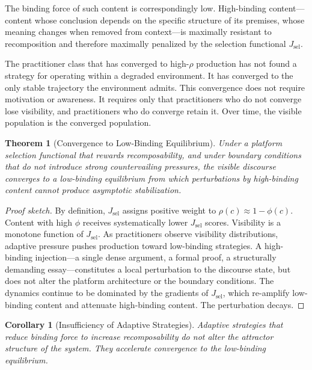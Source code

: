 \documentclass[12pt]{article}
\newtheorem{theorem}{Theorem}[section]
\newtheorem{corollary}{Corollary}[theorem]
\newcommand{\bind}{\phi}
\newcommand{\recomp}{\rho}
\newcommand{\Jsel}{J_{\mathrm{sel}}}
\begin{document}
The binding force of such content is correspondingly low. High-binding
content—content whose conclusion depends on the specific structure of its
premises, whose meaning changes when removed from context—is maximally
resistant to recomposition and therefore maximally penalized by the
selection functional $\Jsel$.

The practitioner class that has converged to high-$\recomp$ production has
not found a strategy for operating within a degraded environment. It has
converged to the only stable trajectory the environment admits. This
convergence does not require motivation or awareness. It requires only that
practitioners who do not converge lose visibility, and practitioners who do
converge retain it. Over time, the visible population is the converged
population.

\begin{theorem}[Convergence to Low-Binding Equilibrium]
\label{thm:convergence}
Under a platform selection functional that rewards recomposability, and
under boundary conditions that do not introduce strong countervailing
pressures, the visible discourse converges to a low-binding equilibrium
from which perturbations by high-binding content cannot produce
asymptotic stabilization.
\end{theorem}

\begin{proof}[Proof sketch]
By definition, $\Jsel$ assigns positive weight to $\recomp(c) \approx
1 - \bind(c)$. Content with high $\bind$ receives systematically lower
$\Jsel$ scores. Visibility is a monotone function of $\Jsel$. As
practitioners observe visibility distributions, adaptive pressure pushes
production toward low-binding strategies. A high-binding injection—a
single dense argument, a formal proof, a structurally demanding
essay—constitutes a local perturbation to the discourse state, but does
not alter the platform architecture or the boundary conditions. The
dynamics continue to be dominated by the gradients of $\Jsel$, which
re-amplify low-binding content and attenuate high-binding content. The
perturbation decays.
\end{proof}

\begin{corollary}[Insufficiency of Adaptive Strategies]
Adaptive strategies that reduce binding force to increase recomposability
do not alter the attractor structure of the system. They accelerate
convergence to the low-binding equilibrium.
\end{corollary}
\end{document}
